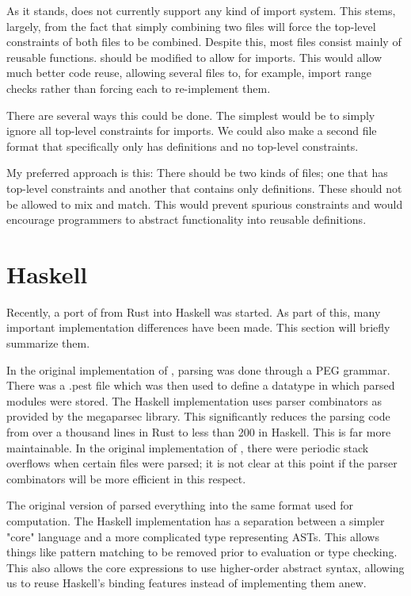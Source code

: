 \documentclass[
    9pt,            
    techreport,       
    affiltop,       
]{art}
\begin{document}
As it stands, \VampIR{} does not currently support any kind of import system. This stems, largely, from the fact that simply combining two files will force the top-level constraints of both files to be combined. Despite this, most \VampIR{} files consist mainly of reusable functions. \VampIR{} should be modified to allow for imports. This would allow much better code reuse, allowing several files to, for example, import range checks rather than forcing each to re-implement them.

There are several ways this could be done. The simplest would be to simply ignore all top-level constraints for imports. We could also make a second file format that specifically only has definitions and no top-level constraints.

My preferred approach is this: There should be two kinds of \VampIR{} files; one that has top-level constraints and another that contains only definitions. These should not be allowed to mix and match. This would prevent spurious constraints and would encourage programmers to abstract functionality into reusable definitions.

\section{\VampIR{} Haskell}\label{sec:vamp-ir-haskell}

Recently, a port of \VampIR{} from Rust into Haskell was started. As part of this, many important implementation differences have been made. This section will briefly summarize them.

In the original implementation of \VampIR{}, parsing was done through a PEG grammar. There was a .pest file which was then used to define a datatype in which parsed modules were stored. The Haskell implementation uses parser combinators as provided by the megaparsec library. This significantly reduces the parsing code from over a thousand lines in Rust to less than 200 in Haskell. This is far more maintainable. In the original implementation of \VampIR{}, there were periodic stack overflows when certain files were parsed; it is not clear at this point if the parser combinators will be more efficient in this respect.

The original version of \VampIR{} parsed everything into the same format used for computation. The Haskell implementation has a separation between a simpler "core" language and a more complicated type representing \VampIR{} ASTs. This allows things like pattern matching to be removed prior to evaluation or type checking. This also allows the core expressions to use higher-order abstract syntax, allowing us to reuse Haskell's binding features instead of implementing them anew.
\end{document}
